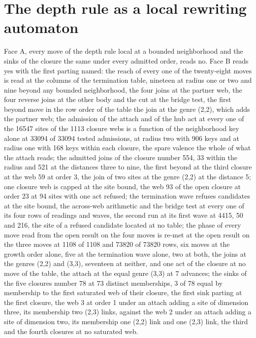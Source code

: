 \section{The depth rule as a local rewriting automaton}\label{mod:X-12-D545180-w-lrwa}
\begin{chwall}
Face A, every move of the depth rule local at a bounded neighborhood and the sinks of the closure the same under every admitted order, reads no. Face B reads yes with the first parting named: the reach of every one of the twenty-eight moves is read at the columns of the termination table, nineteen at radius one or two and nine beyond any bounded neighborhood, the four joins at the partner web, the four reverse joins at the other body and the cut at the bridge test, the first beyond move in the row order of the table the join at the genre (2,2), which adds the partner web; the admission of the attach and of the hub act at every one of the 16547 sites of the 1113 closure webs is a function of the neighborhood key alone at 33094 of 33094 tested admissions, at radius two with 906 keys and at radius one with 168 keys within each closure, the spare valence the whole of what the attach reads; the admitted joins of the closure number 554, 33 within the radius and 521 at the distances three to nine, the first beyond at the third closure at the web 59 at order 3, the join of two sites at the genre (2,2) at the distance 5; one closure web is capped at the site bound, the web 93 of the open closure at order 23 at 94 sites with one act refused; the termination wave refuses candidates at the site bound, the across-web arithmetic and the bridge test at every one of its four rows of readings and waves, the second run at its first wave at 4415, 50 and 216, the site of a refused candidate located at no table; the phase of every move read from the open result on the four moves is re-met at the open result on the three moves at 1108 of 1108 and 73820 of 73820 rows, six moves at the growth order alone, five at the termination wave alone, two at both, the joins at the genres (2,2) and (3,3), seventeen at neither, and one act of the closure at no move of the table, the attach at the equal genre (3,3) at 7 advances; the sinks of the five closures number 78 at 73 distinct memberships, 3 of 78 equal by membership to the first saturated web of their closure, the first sink parting at the first closure, the web 3 at order 1 under an attach adding a site of dimension three, its membership two (2,3) links, against the web 2 under an attach adding a site of dimension two, its membership one (2,2) link and one (2,3) link, the third and the fourth closures at no saturated web.
\end{chwall}
